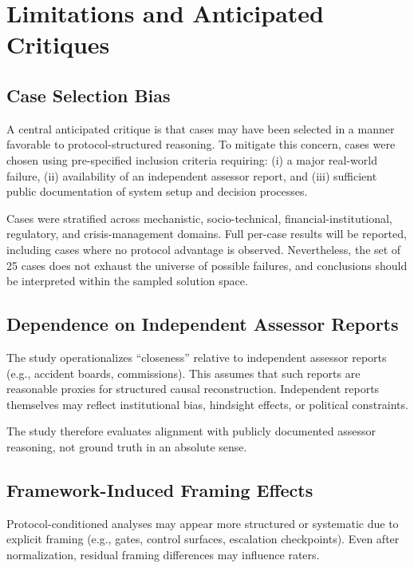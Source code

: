 \section{Limitations and Anticipated Critiques}
\label{sec:limitations}

\subsection{Case Selection Bias}

A central anticipated critique is that cases may have been selected in a manner favorable to protocol-structured reasoning. To mitigate this concern, cases were chosen using pre-specified inclusion criteria requiring: (i) a major real-world failure, (ii) availability of an independent assessor report, and (iii) sufficient public documentation of system setup and decision processes. 

Cases were stratified across mechanistic, socio-technical, financial-institutional, regulatory, and crisis-management domains. Full per-case results will be reported, including cases where no protocol advantage is observed. Nevertheless, the set of 25 cases does not exhaust the universe of possible failures, and conclusions should be interpreted within the sampled solution space.

\subsection{Dependence on Independent Assessor Reports}

The study operationalizes “closeness” relative to independent assessor reports (e.g., accident boards, commissions). This assumes that such reports are reasonable proxies for structured causal reconstruction. Independent reports themselves may reflect institutional bias, hindsight effects, or political constraints. 

The study therefore evaluates alignment with publicly documented assessor reasoning, not ground truth in an absolute sense.

\subsection{Framework-Induced Framing Effects}

Protocol-conditioned analyses may appear more structured or systematic due to explicit framing (e.g., gates, control surfaces, escalation checkpoints). Even after normalization, residual framing differences may influence raters. 

